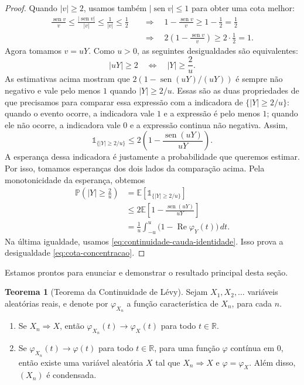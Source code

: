 \documentclass[12pt,portuguese]{article}
\theoremstyle{definition}
\newtheorem{theorem}{Teorema}
\theoremstyle{plainexercise}
\theoremstyle{starredexercise}
\theoremstyle{definition}
\renewcommand{\sin}{\operatorname{sen}}
\begin{document}
\begin{proof}
Quando $|v|\geqslant2$, usamos também $|\sin v|\leqslant1$ para obter
uma cota melhor:
\begin{align*}
\frac{\sin v}{v}
\leqslant\frac{|\sin v|}{|v|}
\leqslant\frac{1}{|v|}
\leqslant\frac12
&\quad\Longrightarrow\quad
1-\frac{\sin v}{v}
\geqslant1-\frac12=\frac12
\\[0.5cm]
&\quad\Longrightarrow\quad
2\left(1-\frac{\sin v}{v}\right)
\geqslant2\cdot\frac12=1.
\end{align*}
Agora tomamos $v=uY$. Como $u>0$, as seguintes desigualdades são equivalentes:
\[
|uY|\geqslant2
\quad\Longleftrightarrow\quad
|Y|\geqslant\frac{2}{u}.
\]
As estimativas acima mostram que $2(1-\sin(uY)/(uY))$ é sempre não
negativo e vale pelo menos $1$ quando $|Y|\geqslant2/u$. Essas são as
duas propriedades de que precisamos para comparar essa expressão com a
indicadora de $\{|Y|\geqslant2/u\}$: quando o evento ocorre, a indicadora
vale $1$ e a expressão é pelo menos $1$; quando ele não ocorre, a
indicadora vale $0$ e a expressão continua não negativa. Assim,
\[
\mathds{1}_{\{|Y|\geqslant2/u\}}
\leqslant2\left(1-\frac{\sin(uY)}{uY}\right).
\]
A esperança dessa indicadora é justamente a probabilidade que queremos
estimar. Por isso, tomamos esperanças dos dois lados da comparação acima.
Pela monotonicidade da esperança, obtemos
\begin{align*}
\mathbb{P}\left(|Y|\geqslant\frac{2}{u}\right)
&=\mathbb{E}\left[\mathds{1}_{\{|Y|\geqslant2/u\}}\right]
\\[0.2cm]
&\leqslant2\mathbb{E}\left[1-\frac{\sin(uY)}{uY}\right]
\\[0.2cm]
&=\frac{1}{u}\int_{-u}^{u}
\bigl(1-\operatorname{Re}\varphi_Y(t)\bigr)\,dt.
\end{align*}
Na última igualdade, usamos \eqref{eq:continuidade-cauda-identidade}.
Isso prova a desigualdade \eqref{eq:cota-concentracao}.
\end{proof}

Estamos prontos para enunciar e demonstrar o resultado principal desta seção.


\begin{theorem}[Teorema da Continuidade de Lévy]\label{thm:continuidade}
Sejam $X_1,X_2,\ldots$ variáveis aleatórias reais, e denote por
$\varphi_{X_n}$ a função característica de $X_n$, para cada $n$.

\begin{enumerate}[label=\textup{(\roman*)}]
\item Se $X_n\Rightarrow X$, então
$\varphi_{X_n}(t)\to\varphi_X(t)$ para todo $t\in\mathbb{R}$.

\item Se $\varphi_{X_n}(t)\to\varphi(t)$ para todo $t\in\mathbb{R}$, para uma
função $\varphi$ contínua em $0$, então existe uma variável aleatória $X$ tal que
$X_n\Rightarrow X$ e $\varphi=\varphi_X$. Além disso, $(X_n)$ é condensada.
\end{enumerate}
\end{theorem}
\end{document}
